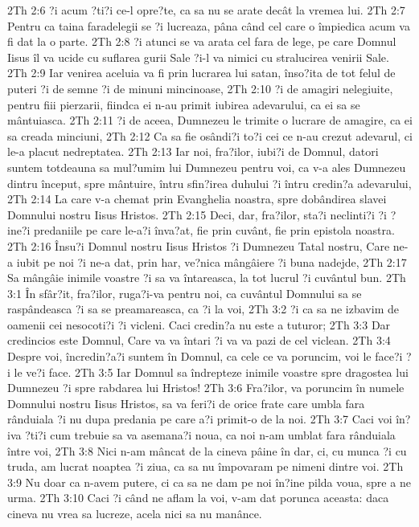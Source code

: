 2Th 2:6  ?i acum ?ti?i ce-l opre?te, ca sa nu se arate decât la vremea lui.
2Th 2:7  Pentru ca taina faradelegii se ?i lucreaza, pâna când cel care o împiedica acum va fi dat la o parte.
2Th 2:8  ?i atunci se va arata cel fara de lege, pe care Domnul Iisus îl va ucide cu suflarea gurii Sale ?i-l va nimici cu stralucirea venirii Sale.
2Th 2:9  Iar venirea aceluia va fi prin lucrarea lui satan, înso?ita de tot felul de puteri ?i de semne ?i de minuni mincinoase,
2Th 2:10  ?i de amagiri nelegiuite, pentru fiii pierzarii, fiindca ei n-au primit iubirea adevarului, ca ei sa se mântuiasca.
2Th 2:11  ?i de aceea, Dumnezeu le trimite o lucrare de amagire, ca ei sa creada minciuni,
2Th 2:12  Ca sa fie osândi?i to?i cei ce n-au crezut adevarul, ci le-a placut nedreptatea.
2Th 2:13  Iar noi, fra?ilor, iubi?i de Domnul, datori suntem totdeauna sa mul?umim lui Dumnezeu pentru voi, ca v-a ales Dumnezeu dintru început, spre mântuire, întru sfin?irea duhului ?i întru credin?a adevarului,
2Th 2:14  La care v-a chemat prin Evanghelia noastra, spre dobândirea slavei Domnului nostru Iisus Hristos.
2Th 2:15  Deci, dar, fra?ilor, sta?i neclinti?i ?i ?ine?i predaniile pe care le-a?i înva?at, fie prin cuvânt, fie prin epistola noastra.
2Th 2:16  Însu?i Domnul nostru Iisus Hristos ?i Dumnezeu Tatal nostru, Care ne-a iubit pe noi ?i ne-a dat, prin har, ve?nica mângâiere ?i buna nadejde,
2Th 2:17  Sa mângâie inimile voastre ?i sa va întareasca, la tot lucrul ?i cuvântul bun.
2Th 3:1  În sfâr?it, fra?ilor, ruga?i-va pentru noi, ca cuvântul Domnului sa se raspândeasca ?i sa se preamareasca, ca ?i la voi,
2Th 3:2  ?i ca sa ne izbavim de oamenii cei nesocoti?i ?i vicleni. Caci credin?a nu este a tuturor;
2Th 3:3  Dar credincios este Domnul, Care va va întari ?i va va pazi de cel viclean.
2Th 3:4  Despre voi, încredin?a?i suntem în Domnul, ca cele ce va poruncim, voi le face?i ?i le ve?i face.
2Th 3:5  Iar Domnul sa îndrepteze inimile voastre spre dragostea lui Dumnezeu ?i spre rabdarea lui Hristos!
2Th 3:6  Fra?ilor, va poruncim în numele Domnului nostru Iisus Hristos, sa va feri?i de orice frate care umbla fara rânduiala ?i nu dupa predania pe care a?i primit-o de la noi.
2Th 3:7  Caci voi în?iva ?ti?i cum trebuie sa va asemana?i noua, ca noi n-am umblat fara rânduiala între voi,
2Th 3:8  Nici n-am mâncat de la cineva pâine în dar, ci, cu munca ?i cu truda, am lucrat noaptea ?i ziua, ca sa nu împovaram pe nimeni dintre voi.
2Th 3:9  Nu doar ca n-avem putere, ci ca sa ne dam pe noi în?ine pilda voua, spre a ne urma.
2Th 3:10  Caci ?i când ne aflam la voi, v-am dat porunca aceasta: daca cineva nu vrea sa lucreze, acela nici sa nu manânce.
